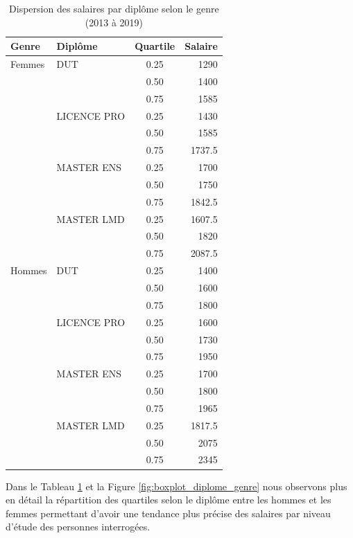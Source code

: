 \documentclass[12pt, a4paper, titlepage, table]{article}
\begin{document}
	\begin{table}[H]
		\centering
		\begin{tabular}{llcr}
			\toprule
			\textbf{Genre} & \textbf{Diplôme} & \textbf{Quartile} & \textbf{Salaire} \\
			\midrule
			Femmes & DUT & 0.25 & 1290 \\
			&     & 0.50 & 1400 \\
			&     & 0.75 & 1585 \\
			\cmidrule{2-4}
			& LICENCE PRO & 0.25 & 1430 \\
			&             & 0.50 & 1585 \\
			&             & 0.75 & 1737.5 \\
			\cmidrule{2-4}
			& MASTER ENS & 0.25 & 1700 \\
			&            & 0.50 & 1750 \\
			&            & 0.75 & 1842.5 \\
			\cmidrule{2-4}
			& MASTER LMD & 0.25 & 1607.5 \\
			&            & 0.50 & 1820 \\
			&            & 0.75 & 2087.5 \\
			\midrule
			Hommes & DUT & 0.25 & 1400 \\
			&     & 0.50 & 1600 \\
			&     & 0.75 & 1800 \\
			\cmidrule{2-4}
			& LICENCE PRO & 0.25 & 1600 \\
			&             & 0.50 & 1730 \\
			&             & 0.75 & 1950 \\
			\cmidrule{2-4}
			& MASTER ENS & 0.25 & 1700 \\
			&            & 0.50 & 1800 \\
			&            & 0.75 & 1965 \\
			\cmidrule{2-4}
			& MASTER LMD & 0.25 & 1817.5 \\
			&            & 0.50 & 2075 \\
			&            & 0.75 & 2345 \\
			\bottomrule
		\end{tabular}
		\caption{Dispersion des salaires par diplôme selon le genre (2013 à 2019)}
		\label{tab:quartile_values_diplome}
	\end{table}
	
	
	Dans le Tableau \ref{tab:quartile_values_diplome} et la Figure \ref{fig:boxplot_diplome_genre} nous observons plus en détail la répartition des quartiles selon le diplôme entre les hommes et les femmes permettant d'avoir une tendance plus précise des salaires par niveau d'étude des personnes interrogées. 
	
\end{document}
